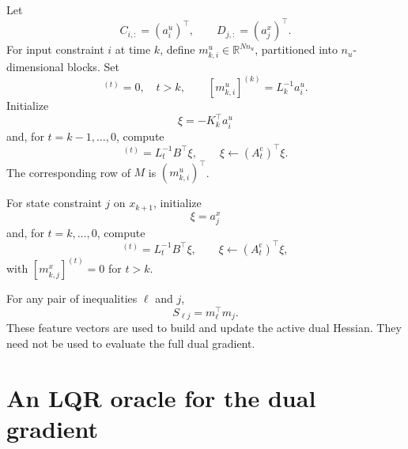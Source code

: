 \documentclass[11pt]{article}
\newcommand{\R}{\mathbb{R}}
\begin{document}
Let
\[
C_{i,:}=(a_i^u)^\top,\qquad
D_{j,:}=(a_j^x)^\top.
\]
For input constraint \(i\) at time \(k\), define
\(m_{k,i}^u\in\R^{Nn_u}\), partitioned into \(n_u\)-dimensional
blocks. Set
\begin{equation}
[m_{k,i}^u]^{(t)}=0,\quad t>k,
\qquad
[m_{k,i}^u]^{(k)}=L_k^{-1}a_i^u.
\end{equation}
Initialize
\[
\xi=-K_k^\top a_i^u
\]
and, for \(t=k-1,\ldots,0\), compute
\begin{equation}
[m_{k,i}^u]^{(t)}=L_t^{-1}B^\top\xi,
\qquad
\xi\leftarrow(A_t^{\mathrm c})^\top\xi.
\label{eq:input-feature-recursion}
\end{equation}
The corresponding row of \(M\) is \((m_{k,i}^u)^\top\).

For state constraint \(j\) on \(x_{k+1}\), initialize
\[
\xi=a_j^x
\]
and, for \(t=k,\ldots,0\), compute
\begin{equation}
[m_{k,j}^x]^{(t)}=L_t^{-1}B^\top\xi,
\qquad
\xi\leftarrow(A_t^{\mathrm c})^\top\xi,
\label{eq:state-feature-recursion}
\end{equation}
with \([m_{k,j}^x]^{(t)}=0\) for \(t>k\).

For any pair of inequalities \(\ell\) and \(j\),
\begin{equation}
S_{\ell j}=m_\ell^\top m_j.
\label{eq:hessian-inner-product}
\end{equation}
These feature vectors are used to build and update the active dual
Hessian. They need not be used to evaluate the full dual gradient.

\section{An LQR oracle for the dual gradient}
\end{document}
